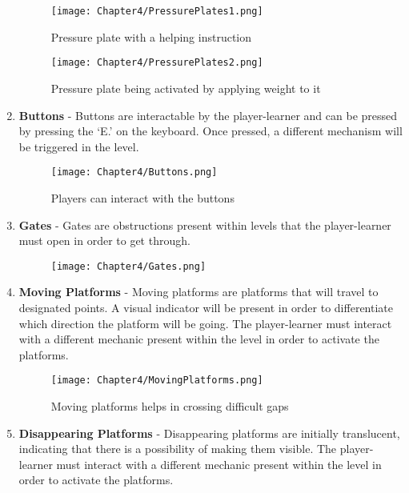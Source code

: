 \begin{enumerate}
\begin{figure}[H]
\hspace*{-1cm}
   \centering                  
   \texttt{[image: Chapter4/PressurePlates1.png]}      
   \caption{Pressure plate with a helping instruction}
    \label{fig:pplates1}
\end{figure}
\begin{figure}[H]
\hspace*{-1cm}
   \centering                  
   \texttt{[image: Chapter4/PressurePlates2.png]}      
   \caption{Pressure plate being activated by applying weight to it}
    \label{fig:pplates2}
\end{figure}
    \item \textbf{Buttons} - Buttons are interactable by the player-learner and can be pressed by pressing the ‘E.’ on the keyboard. Once pressed, a different mechanism will be triggered in the level.
\begin{figure}[H]
\hspace*{-1cm}
   \centering                  
   \texttt{[image: Chapter4/Buttons.png]}      
   \caption{Players can interact with the buttons}
    \label{fig:buttons}
\end{figure}
    \item \textbf{Gates} - Gates are obstructions present within levels that the player-learner must open in order to get through.
\begin{figure}[H]
\hspace*{-1cm}
   \centering                  
   \texttt{[image: Chapter4/Gates.png]}      
   \caption{}
    \label{fig:gates}
\end{figure}
    \item \textbf{Moving Platforms} - Moving platforms are platforms that will travel to designated points. A visual indicator will be present in order to differentiate which direction the platform will be going. The player-learner must interact with a different mechanic present within the level in order to activate the platforms.
\begin{figure}[H]
\hspace*{-1cm}
   \centering                  
   \texttt{[image: Chapter4/MovingPlatforms.png]}      
   \caption{Moving platforms helps in crossing difficult gaps}
    \label{fig:keyshape}
\end{figure}
    \item \textbf{Disappearing Platforms} - Disappearing platforms are initially translucent, indicating that there is a possibility of making them visible. The player-learner must interact with a different mechanic present within the level in order to activate the platforms.

\end{enumerate}
